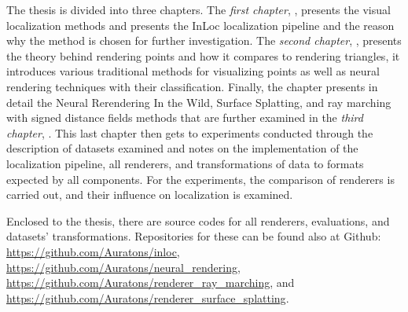 The thesis is divided into three chapters. The \emph{first chapter},
, presents the visual localization
methods and presents the InLoc localization pipeline and the
reason why the method is chosen for further investigation.
The \emph{second chapter}, , presents
the theory behind rendering points and how it compares to
rendering triangles, it introduces various traditional methods
for visualizing points as well as neural rendering techniques
with their classification. Finally, the chapter presents in
detail the Neural Rerendering In the Wild, Surface Splatting,
and ray marching with signed distance fields methods that are
further examined in the \emph{third chapter},
. This last chapter then gets to
experiments conducted through the description of datasets examined
and notes on the implementation of the localization pipeline, all
renderers, and transformations of data to formats expected by
all components. For the experiments, the comparison of renderers is
carried out, and their influence on localization is examined.

Enclosed to the thesis, there are source codes for all renderers,
evaluations, and datasets' transformations. Repositories for these
can be found also at Github: \url{https://github.com/Auratons/inloc},
\url{https://github.com/Auratons/neural_rendering},
\url{https://github.com/Auratons/renderer_ray_marching}, and
\url{https://github.com/Auratons/renderer_surface_splatting}.
